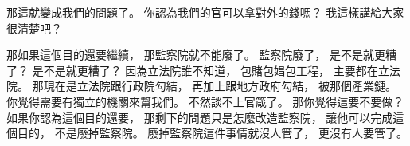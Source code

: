 \hypertarget{w01:cue:3118}{}那這就變成我們的問題了。
\hypertarget{w01:cue:3119}{}你認為我們的官可以拿對外的錢嗎？
\hypertarget{w01:cue:3120}{}我這樣講給大家很清楚吧？

\hypertarget{w01:cue:3121}{}那如果這個目的還要繼續，
\hypertarget{w01:cue:3122}{}那監察院就不能廢了。
\hypertarget{w01:cue:3123}{}監察院廢了，
\hypertarget{w01:cue:3124}{}是不是就更糟了？
\hypertarget{w01:cue:3125}{}是不是就更糟了？
\hypertarget{w01:cue:3126}{}因為立法院誰不知道，
\hypertarget{w01:cue:3127}{}包賭包娼包工程，
\hypertarget{w01:cue:3128}{}主要都在立法院。
\hypertarget{w01:cue:3129}{}那現在是立法院跟行政院勾結，
\hypertarget{w01:cue:3130}{}再加上跟地方政府勾結，
\hypertarget{w01:cue:3131}{}被那個產業鏈。
\hypertarget{w01:cue:3132}{}你覺得需要有獨立的機關來幫我們。
\hypertarget{w01:cue:3133}{}不然談不上官箴了。
\hypertarget{w01:cue:3134}{}那你覺得這要不要做？
\hypertarget{w01:cue:3135}{}如果你認為這個目的還要，
\hypertarget{w01:cue:3136}{}那剩下的問題只是怎麼改造監察院，
\hypertarget{w01:cue:3137}{}讓他可以完成這個目的，
\hypertarget{w01:cue:3138}{}不是廢掉監察院。
\hypertarget{w01:cue:3139}{}廢掉監察院這件事情就沒人管了，
\hypertarget{w01:cue:3140}{}更沒有人要管了。

